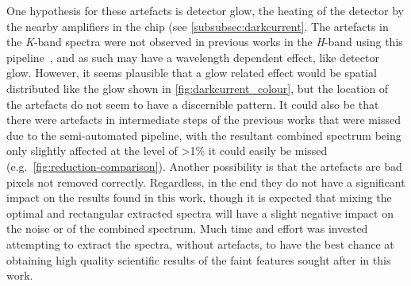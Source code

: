 One hypothesis for these artefacts is detector glow, the heating of the detector by the nearby amplifiers in the chip (see \cref{subsubsec:darkcurrent}.
The artefacts in the \emph{K}-band spectra were not observed in previous works in the \emph{H}-band using this pipeline~\citep[e.g.][]{figueira_radial_2010}, and as such may have a wavelength dependent effect, like detector glow.
However, it seems plausible that a glow related effect would be spatial distributed like the glow shown in \cref{fig:darkcurrent_colour}, but the location of the artefacts do not seem to have a discernible pattern.
It could also be that there were artefacts in intermediate steps of the previous works that were missed due to the semi-automated pipeline, with the resultant combined spectrum being only slightly affected at the level of >1\% it could easily be missed (e.g.\ \cref{fig:reduction-comparison}).
Another possibility is that the artefacts are bad pixels not removed correctly.
Regardless, in the end they do not have a significant impact on the results found in this work, though it is expected that mixing the optimal and rectangular extracted spectra will have a slight negative impact on the noise or \snr{} of the combined spectrum.
Much time and effort was invested attempting to extract the spectra, without artefacts, to have the best chance at obtaining high quality scientific results of the faint features sought after in this work.
